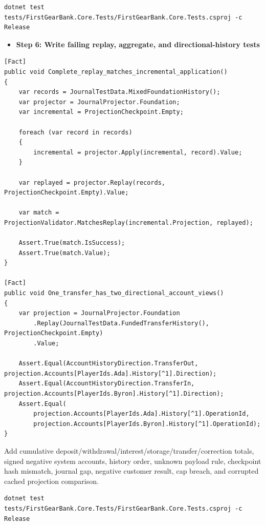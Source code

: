 \documentclass[
  10pt,
  letterpaper,
]{article}
\providecommand{\tightlist}{%
  \setlength{\itemsep}{0pt}\setlength{\parskip}{0pt}}
\begin{document}
\begin{lstlisting}
dotnet test tests/FirstGearBank.Core.Tests/FirstGearBank.Core.Tests.csproj -c Release
\end{lstlisting}

\begin{itemize}
\tightlist
\item[$\square$]
  \textbf{Step 6: Write failing replay, aggregate, and
  directional-history tests}
\end{itemize}

\begin{lstlisting}
[Fact]
public void Complete_replay_matches_incremental_application()
{
    var records = JournalTestData.MixedFoundationHistory();
    var projector = JournalProjector.Foundation;
    var incremental = ProjectionCheckpoint.Empty;

    foreach (var record in records)
    {
        incremental = projector.Apply(incremental, record).Value;
    }

    var replayed = projector.Replay(records, ProjectionCheckpoint.Empty).Value;

    var match = ProjectionValidator.MatchesReplay(incremental.Projection, replayed);

    Assert.True(match.IsSuccess);
    Assert.True(match.Value);
}

[Fact]
public void One_transfer_has_two_directional_account_views()
{
    var projection = JournalProjector.Foundation
        .Replay(JournalTestData.FundedTransferHistory(), ProjectionCheckpoint.Empty)
        .Value;

    Assert.Equal(AccountHistoryDirection.TransferOut, projection.Accounts[PlayerIds.Ada].History[^1].Direction);
    Assert.Equal(AccountHistoryDirection.TransferIn, projection.Accounts[PlayerIds.Byron].History[^1].Direction);
    Assert.Equal(
        projection.Accounts[PlayerIds.Ada].History[^1].OperationId,
        projection.Accounts[PlayerIds.Byron].History[^1].OperationId);
}
\end{lstlisting}

Add cumulative
deposit/\allowbreak{}withdrawal/\allowbreak{}interest/\allowbreak{}storage/\allowbreak{}transfer/\allowbreak{}correction
totals, signed negative system accounts, history order, unknown payload
rule, checkpoint hash mismatch, journal gap, negative customer result,
cap breach, and corrupted cached projection comparison.

\begin{lstlisting}
dotnet test tests/FirstGearBank.Core.Tests/FirstGearBank.Core.Tests.csproj -c Release
\end{lstlisting}
\end{document}

